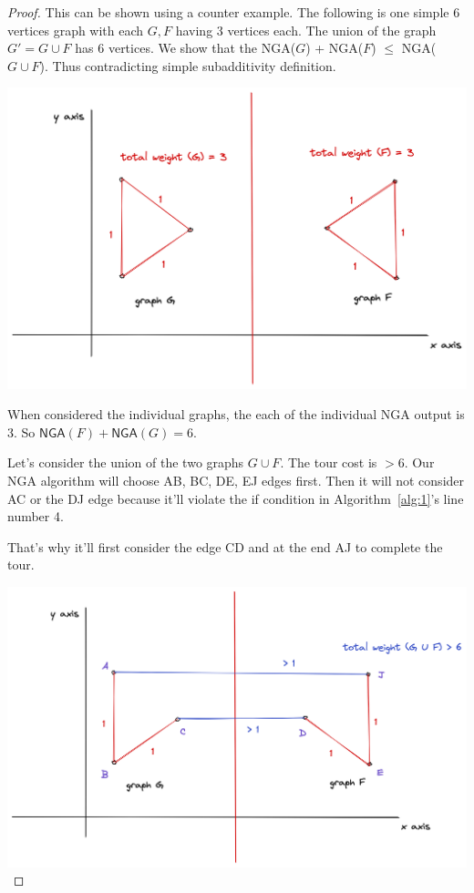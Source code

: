 \documentclass{article}
\theoremstyle{define}
\theoremstyle{remark}
\begin{document}
\begin{proof}
    This can be shown using a counter example.
    The following is one simple $6$ vertices graph with each $G, F$ having 3
    vertices each. The union of the graph $G' = G \cup F$ has $6$ vertices. We
    show that the \textsf{NGA}($G$) + \textsf{NGA}($F$) $\leq$
    \textsf{NGA}($G \cup F$). Thus contradicting simple subadditivity definition.

    \includegraphics[scale=0.13]{non-subadditive.png}

    When considered the individual graphs, the each of the individual \textsf{NGA} output is 3.
    So $\textsf{NGA}(F) + \textsf{NGA}(G) = 6$.

    Let's consider the union of the two graphs $G \cup F$. The tour cost is $> 6$.
    Our \textsf{NGA} algorithm will choose AB, BC, DE, EJ edges first. Then it will not
    consider AC or the DJ edge because it'll violate the if condition in Algorithm~\ref{alg:1}'s line number 4.

    That's why it'll first consider the edge CD and at the end AJ to complete the tour.

    \includegraphics[scale=0.13]{non-subadditive2.png}
\end{proof}
\end{document}
